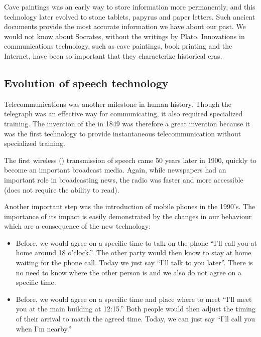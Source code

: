 \documentclass[letterpaper,10pt,english]{jupyterBook}
\begin{document}
\sphinxAtStartPar
Cave paintings was an early way to store information more permanently,
and this technology later evolved to stone tablets, papyrus and paper
letters. Such ancient documents provide the most accurate information we
have about our past. We would not know about Socrates, without the
writings by Plato. Innovations in communications technology, such as
cave paintings, book printing and the Internet, have been so important
that they characterize historical eras.

\sphinxAtStartPar
{}


\subsection{Evolution of speech technology}
\label{\detokenize{Introduction/Why_speech_processing:evolution-of-speech-technology}}
\sphinxAtStartPar
Telecommunications was another milestone in human history. Though the
telegraph was an effective way for communicating, it also required
specialized training. The invention of the
 in 1849 was
therefore a great invention because it was the first technology to
provide instantaneous telecommunication without specialized training.

\sphinxAtStartPar
The first wireless ()
transmission of speech came 50 years later in 1900, quickly to become an
important broadcast media. Again, while newspapers had an important role
in broadcasting news, the radio was faster and more accessible (does not
require the ability to read).

\sphinxAtStartPar
Another important step was the introduction of mobile phones in the
1990’s. The importance of its impact is easily demonstrated by the
changes in our behaviour which are a consequence of the new technology:
\begin{itemize}
\item {} 
\sphinxAtStartPar
Before, we would agree on a specific time to talk on the phone \sphinxhyphen{}
“I’ll call you at home around 18 o’clock.”. The other party would
then know to stay at home waiting for the phone call. Today we just
say “I’ll talk to you later”. There is no need to know where the
other person is and we also do not agree on a specific time.

\item {} 
\sphinxAtStartPar
Before, we would agree on a specific time and place where to meet \sphinxhyphen{}
“I’ll meet you at the main building at 12:15.” Both people would
then adjust the timing of their arrival to match the agreed time.
Today, we can just say “I’ll call you when I’m nearby.”

\end{itemize}
\end{document}
